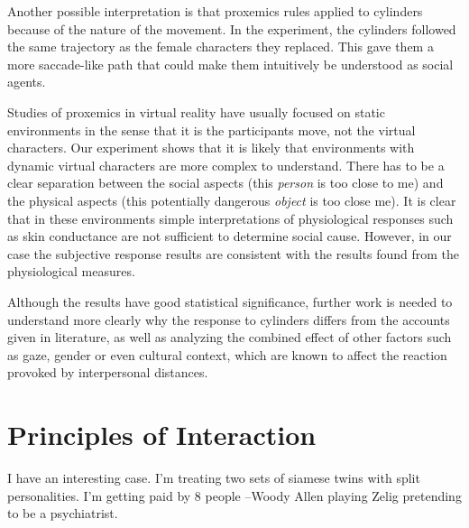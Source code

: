 \documentclass[
		twoside,openright,titlepage,numbers=noenddot,manychapters,
		headinclude,%
                footinclude=false,cleardoublepage=empty,
                BCOR=5mm,
		fontsize=11pt, %
                 enabledeprecatedfontcommands]{scrreprt}
\begin{document}
Another possible interpretation is that proxemics rules applied to cylinders because of the nature of the movement. In the experiment, the cylinders followed the same trajectory as the female characters they replaced. This gave them a more saccade-like path that could make them intuitively be understood as  social agents. 

Studies of proxemics in virtual reality have usually focused on static environments in the sense that it is the participants move, not the virtual characters. Our experiment shows that it is likely that environments with dynamic virtual characters are more complex to understand. There has to be a clear separation between the social aspects (this \emph{person} is too close to me) and the physical aspects (this potentially dangerous \emph{object} is too close me). It is clear that in these environments simple interpretations of physiological responses such as skin conductance are not sufficient to determine social cause. However, in our case the subjective response results are consistent with the results found from the physiological measures.


Although the results have good statistical significance, further work is needed to understand more clearly why the response to cylinders differs from the accounts given in literature, as well as analyzing the combined effect of other factors such as gaze, gender or even cultural context, which are known to affect the reaction provoked by interpersonal distances.

\cleardoublepage




\chapter{Principles of Interaction}
\thispagestyle{empty}
\label{ch_zelig}
\label{zelig_trama}

\begin{origquote}

    I have an interesting case. I'm treating two sets of siamese twins with split personalities. I'm getting paid by 8 people --Woody Allen playing Zelig pretending to be a psychiatrist. \cite[]{allen2001z}

\end{origquote}
\end{document}
